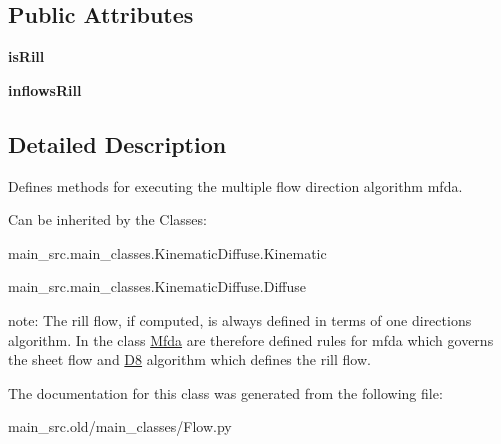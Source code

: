 \subsection*{Public Attributes}
\begin{DoxyCompactItemize}
\item 
\hypertarget{classmain__src_8old_1_1main__classes_1_1Flow_1_1Mfda_a927dc1a111d33fb3ddf04fcd67d5d1dc}{{\bfseries is\-Rill}}\label{classmain__src_8old_1_1main__classes_1_1Flow_1_1Mfda_a927dc1a111d33fb3ddf04fcd67d5d1dc}

\item 
\hypertarget{classmain__src_8old_1_1main__classes_1_1Flow_1_1Mfda_a58cb974391a16df5e7c7f9d36373ca7e}{{\bfseries inflows\-Rill}}\label{classmain__src_8old_1_1main__classes_1_1Flow_1_1Mfda_a58cb974391a16df5e7c7f9d36373ca7e}

\end{DoxyCompactItemize}


\subsection{Detailed Description}
Defines methods for executing the multiple flow direction algorithm mfda. 

Can be inherited by the Classes\-:


\begin{DoxyItemize}
\item main\-\_\-src.\-main\-\_\-classes.\-Kinematic\-Diffuse.\-Kinematic
\item main\-\_\-src.\-main\-\_\-classes.\-Kinematic\-Diffuse.\-Diffuse
\end{DoxyItemize}

note\-: The rill flow, if computed, is always defined in terms of one directions algorithm. In the class \hyperlink{classmain__src_8old_1_1main__classes_1_1Flow_1_1Mfda}{Mfda} are therefore defined rules for mfda which governs the sheet flow and \hyperlink{classmain__src_8old_1_1main__classes_1_1Flow_1_1D8}{D8} algorithm which defines the rill flow. 

The documentation for this class was generated from the following file\-:\begin{DoxyCompactItemize}
\item 
main\-\_\-src.\-old/main\-\_\-classes/Flow.\-py\end{DoxyCompactItemize}
